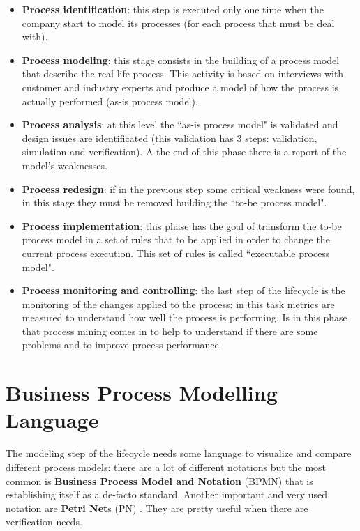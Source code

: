 \begin{itemize}
    \item \textbf{Process identification}: this step is executed only one time when the company start to model its 
        processes (for each process that must be deal with).

    \item \textbf{Process modeling}: this stage consists in the building of a process model that describe the real 
        life process. This activity is based on interviews with customer and industry experts and produce a model 
        of how the process is actually performed (as-is process model).

    \item \textbf{Process analysis}: at this level the ``as-is process model" is validated and design issues are
        identificated (this validation has 3 steps: validation, simulation and verification). A the end of this 
        phase there is a report of the model's weaknesses.

    \item \textbf{Process redesign}: if in the previous step some critical weakness were found, in this stage they 
        must be removed building the ``to-be process model".

    \item \textbf{Process implementation}: this phase has the goal of transform the to-be process model in a set 
        of rules that to be applied in order to change the current process execution. This set of rules is called 
        ``executable process model".

    \item \textbf{Process monitoring and controlling}: the last step of the lifecycle is the monitoring of the 
        changes applied to the process: in this task metrics are measured to understand how well the process 
        is performing. Is in this phase that process mining comes in to help to understand if there are some 
        problems and to improve process performance.
    
\end{itemize}


\section{Business Process Modelling Language}

The modeling step of the lifecycle needs some language to visualize and compare different process models: there are a lot of 
different notations but the most common is \textbf{Business Process Model and Notation} \cite{DBLP:journals/Chinosi} (BPMN) that is 
establishing itself as a de-facto standard. Another important and very used notation are \textbf{Petri Net}s (PN) 
\cite{PetriNetIntroduction}. They are pretty useful when there are verification needs.


